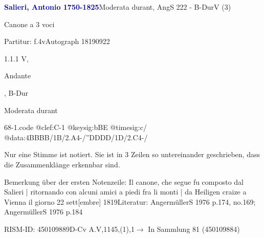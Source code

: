 \documentclass[a4paper, twocolumn, 11pt]{book}
\begin{document}
\par \vspace{16pt} \textcolor{darkblue}{\textbf{Salieri, Antonio  1750-1825}}\hfillplus{[68]}\newline Moderata durant, AngS 222 - B-Dur\newline V (3)
\par \begin{itshape} Canone a 3 voci\end{itshape} 
\par \textcolor{darkblue}{}  Partitur: f.4v\newline Autograph  18190922
\par 1.1.1  V, \begin{itshape}Andante\end{itshape}, B-Dur\newline \begin{footnotesize} Moderata durant \end{footnotesize}  
\begin{filecontents*}{68-1.code}
@clef:C-1
@keysig:bBE
@timesig:c/
@data:4BBBB/1B/2.A4-/''DDDD/1D/2.C4-/
\end{filecontents*}

\newline %
\par Nur eine Stimme ist notiert. Sie ist in 3 Zeilen so untereinander geschrieben, dass die Zusammenklänge erkennbar sind.
\par Bemerkung über der ersten Notenzeile: {\textquotedbl}Il canone, che segue fu composto dal Salieri | ritornando con alcuni amici a piedi fra li monti | da Heiligen craize a Vienna il giorno 22 sett[embre] 1819{\textquotedbl}\newline Literatur: AngermüllerS 1976  p.174, no.169; AngermüllerS 1976  p.184
\par RISM-ID: 450109889\newline D-Cv  A.V,1145,(1),1\newline $\rightarrow$ In Sammlung 81 (450109884)
      
\end{document}
